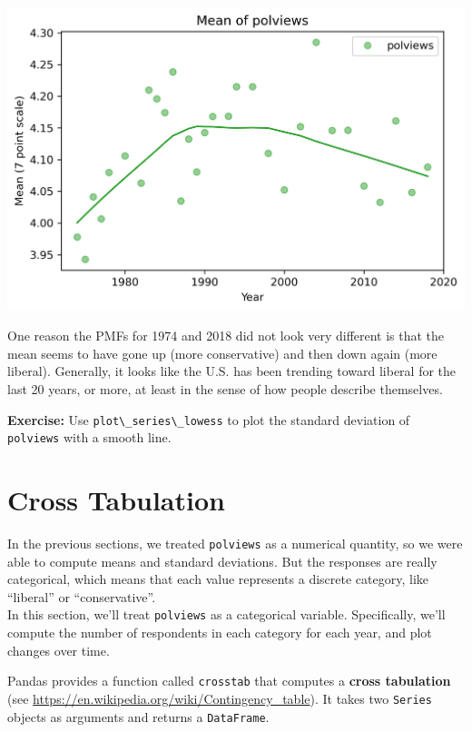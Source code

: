 \begin{center}
\includegraphics[scale=0.75]{02_polviews_soln_files/02_polviews_soln_57_0.png}
\end{center}

One reason the PMFs for 1974 and 2018 did not look very different is
that the mean seems to have gone up (more conservative) and then down
again (more liberal). Generally, it looks like the U.S. has been
trending toward liberal for the last 20 years, or more, at least in the
sense of how people describe themselves.

\textbf{Exercise:} Use \passthrough{\lstinline!plot\_series\_lowess!} to
plot the standard deviation of \passthrough{\lstinline!polviews!} with a
smooth line.

\hypertarget{cross-tabulation}{%
\section{Cross Tabulation}\label{cross-tabulation}}

In the previous sections, we treated \passthrough{\lstinline!polviews!}
as a numerical quantity, so we were able to compute means and standard
deviations. But the responses are really categorical, which means that
each value represents a discrete category, like ``liberal'' or
``conservative''.\\
In this section, we'll treat \passthrough{\lstinline!polviews!} as a
categorical variable. Specifically, we'll compute the number of
respondents in each category for each year, and plot changes over time.

Pandas provides a function called \passthrough{\lstinline!crosstab!}
that computes a \textbf{cross tabulation} (see
\url{https://en.wikipedia.org/wiki/Contingency_table}). It takes two
\passthrough{\lstinline!Series!} objects as arguments and returns a
\passthrough{\lstinline!DataFrame!}.

